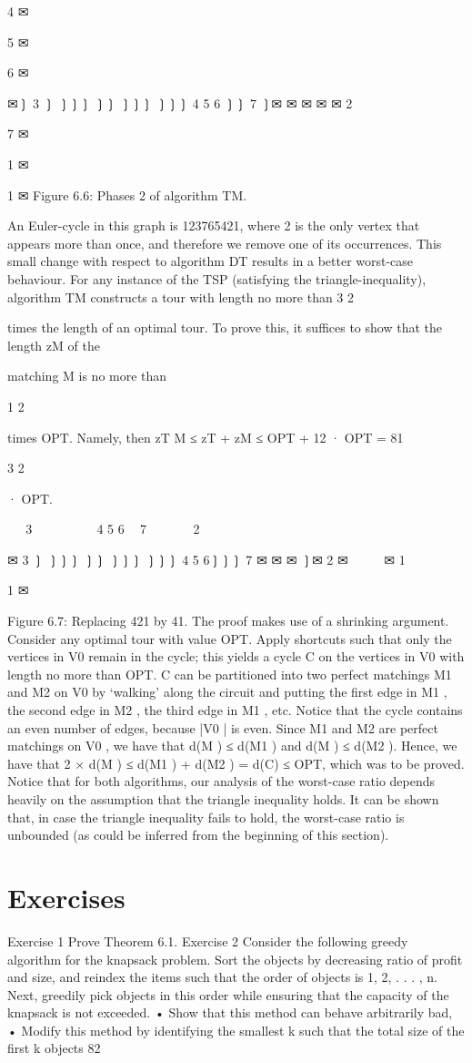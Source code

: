 4
✉

5
✉

6
✉

✉❳
3 ❳
❳❳❳
❳❳
❳❳❳
❳❳❳
4
5
6 ❳❳ 7
❳✉
✉
✉
✉
✉
2

7
✉

1 ✉

1 ✉
Figure 6.6: Phases 2 of algorithm TM.

An Euler-cycle in this graph is 123765421, where 2 is the only vertex that appears more than once, and
therefore we remove one of its occurrences.
This small change with respect to algorithm DT results in a better worst-case behaviour. For any instance
of the TSP (satisfying the triangle-inequality), algorithm TM constructs a tour with length no more than
3
2

times the length of an optimal tour. To prove this, it suffices to show that the length zM of the

matching M is no more than

1
2

times OPT. Namely, then zT M ≤ zT + zM ≤ OPT + 12 · OPT =
81

3
2

· OPT.

❳❳❳
3 ✉
❳❳
❳❳❳
❳❳
❳❳❳
4
5
6 ❳❳ 7
✉
✉
✉
✉
❳✉
2

✉
3 ❳
❳❳❳
❳❳
❳❳❳
❳❳❳
4
5
6❳❳❳ 7
✉
✉
✉
❳✉
2 ✉
 
 
 
✉
1  

1 ✉

Figure 6.7: Replacing 421 by 41.
The proof makes use of a shrinking argument. Consider any optimal tour with value OPT. Apply
shortcuts such that only the vertices in V0 remain in the cycle; this yields a cycle C on the vertices in
V0 with length no more than OPT. C can be partitioned into two perfect matchings M1 and M2 on V0
by ‘walking' along the circuit and putting the first edge in M1 , the second edge in M2 , the third edge in
M1 , etc. Notice that the cycle contains an even number of edges, because |V0 | is even.
Since M1 and M2 are perfect matchings on V0 , we have that d(M ) ≤ d(M1 ) and d(M ) ≤ d(M2 ). Hence,
we have that 2 × d(M ) ≤ d(M1 ) + d(M2 ) = d(C) ≤ OPT, which was to be proved.
Notice that for both algorithms, our analysis of the worst-case ratio depends heavily on the assumption
that the triangle inequality holds. It can be shown that, in case the triangle inequality fails to hold, the
worst-case ratio is unbounded (as could be inferred from the beginning of this section).

\section*{Exercises}
Exercise 1
Prove Theorem 6.1.
Exercise 2
Consider the following greedy algorithm for the knapsack problem. Sort the objects by decreasing ratio
of profit and size, and reindex the items such that the order of objects is 1, 2, . . . , n. Next, greedily pick
objects in this order while ensuring that the capacity of the knapsack is not exceeded.
• Show that this method can behave arbitrarily bad,
• Modify this method by identifying the smallest k such that the total size of the first k objects
82

